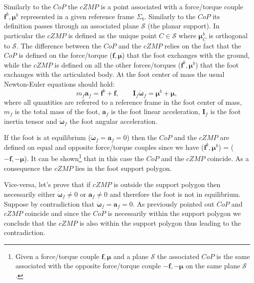\documentclass[12pt,a4paper,twoside]{article}
\begin{document}
Similarly to the $CoP$ the $cZMP$ is a point associated with a force/torque couple $\boldsymbol f^b, \boldsymbol\mu^b$ represented in a given reference frame $\Sigma_b$. Similarly to the $CoP$ its definition passes through an associated plane $\mathcal S$ (the planar support). In particular the $cZMP$ is defined as the unique point $C \in \mathcal S$ where $\boldsymbol\mu^b_C$ is orthogonal to $\mathcal S$. The difference between the $CoP$ and the $cZMP$ relies on the fact that the $CoP$ is defined on the force/torque ($\boldsymbol f, \boldsymbol\mu$) that the foot exchanges with the ground, while the $cZMP$ is defined on all the other forces/torques ($\boldsymbol f^b, \boldsymbol\mu^b$) that the foot exchanges with the articulated body. At the foot center of mass the usual Newton-Euler equations should hold:
$$
m_f \bm a_f = \boldsymbol f^b + \boldsymbol f, \qquad \bm I_f \dot {\boldsymbol \omega}_f =  \boldsymbol \mu^b + \boldsymbol \mu,
$$
where all quantities are referred to a reference frame in the foot center of mass, $m_f$ is the total mass of the foot, $\bm a_f$ is the foot linear acceleration, $\bm I_f $ is the foot inertia tensor and $\dot {\boldsymbol \omega}_f $ the foot angular acceleration. 

If the foot is at equilibrium ($\dot {\boldsymbol \omega}_f = \bm a_f = 0$) then the $CoP$ and the $cZMP$ are defined on equal and opposite force/torque couples since we have ($\boldsymbol f^b, \boldsymbol\mu^b$) = ($-\boldsymbol f, -\boldsymbol\mu$). It can be shown\footnote{Given a force/torque couple $\boldsymbol f, \boldsymbol\mu$ and a plane $\mathcal S$ the associated $CoP$ is the same associated with the opposite force/torque couple $-\boldsymbol f, -\boldsymbol\mu$ on the same plane $\mathcal S$.} that in this case the $CoP$ and the $cZMP$ coincide. As a consequence the $cZMP$ lies in the foot support polygon. 

Vice-versa, let's prove that if $cZMP$ is outside the support polygon then necessarily either $\dot {\boldsymbol \omega}_f \neq 0$ or $\bm a_f \neq 0$ and therefore the foot is not in equilibrium. Suppose by contradiction that $\dot {\boldsymbol \omega}_f = \bm a_f = 0$. As previously pointed out $CoP$ and $cZMP$ coincide and since the $CoP$ is necessarily within the support polygon we conclude that the $cZMP$ is also within the support polygon thus leading to the contradiction. 
\end{document}
